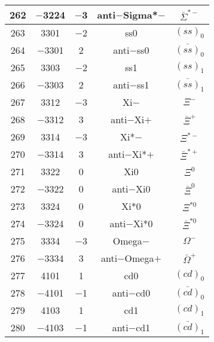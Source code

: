\documentclass{article}
\begin{document}
\begin{table}[!htbp]
\begin{tabular}{|c|c|c|c|c|}
\hline
262 & $-$3224 & $-$3 & anti$-$Sigma*$-$ & $\bar{\Sigma}^{*-}$ \\
\hline
263 & 3301 & $-$2 & ss\underline{\hspace{0.6em}}0 & $(ss)_{0}$ \\
\hline
264 & $-$3301 & 2 & anti$-$ss\underline{\hspace{0.6em}}0 & $\bar{(ss)}_{0}$ \\
\hline
265 & 3303 & $-$2 & ss\underline{\hspace{0.6em}}1 & $(ss)_{1}$ \\
\hline
266 & $-$3303 & 2 & anti$-$ss\underline{\hspace{0.6em}}1 & $\bar{(ss)}_{1}$ \\
\hline
267 & 3312 & $-$3 & Xi$-$ & $\Xi^{-}$ \\
\hline
268 & $-$3312 & 3 & anti$-$Xi$+$ & $\bar{\Xi}^{+}$ \\
\hline
269 & 3314 & $-$3 & Xi*$-$ & $\Xi^{*-}$ \\
\hline
270 & $-$3314 & 3 & anti$-$Xi*$+$ & $\bar{\Xi}^{*+}$ \\
\hline
271 & 3322 & 0 & Xi0 & $\Xi^{0}$ \\
\hline
272 & $-$3322 & 0 & anti$-$Xi0 & $\bar{\Xi}^{0}$ \\
\hline
273 & 3324 & 0 & Xi*0 & $\Xi^{*0}$ \\
\hline
274 & $-$3324 & 0 & anti$-$Xi*0 & $\bar{\Xi}^{*0}$ \\
\hline
275 & 3334 & $-$3 & Omega$-$ & $\Omega^{-}$ \\
\hline
276 & $-$3334 & 3 & anti$-$Omega$+$ & $\bar{\Omega}^{+}$ \\
\hline
277 & 4101 & 1 & cd\underline{\hspace{0.6em}}0 & $(cd)_{0}$ \\
\hline
278 & $-$4101 & $-$1 & anti$-$cd\underline{\hspace{0.6em}}0 & $\bar{(cd)}_{0}$ \\
\hline
279 & 4103 & 1 & cd\underline{\hspace{0.6em}}1 & $(cd)_{1}$ \\
\hline
280 & $-$4103 & $-$1 & anti$-$cd\underline{\hspace{0.6em}}1 & $\bar{(cd)}_{1}$ \\
\hline
\end{tabular}
\end{table}

\clearpage
\end{document}
